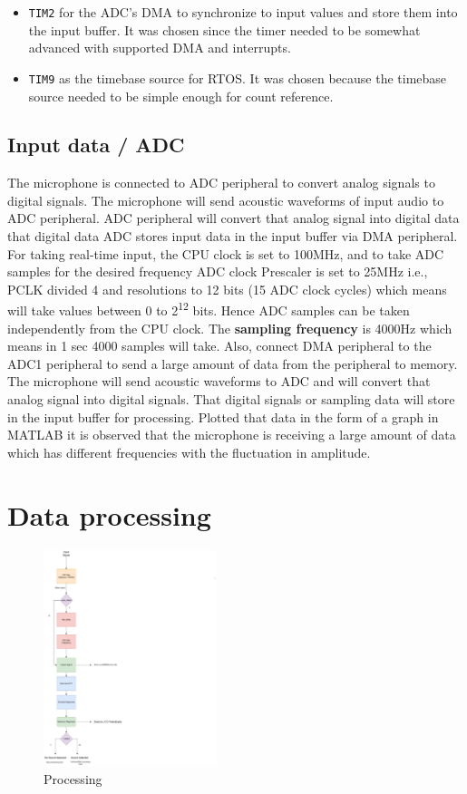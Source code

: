 \documentclass[11pt]{article}
\begin{document}
\begin{itemize}
\item \texttt{TIM2} for the ADC's DMA to synchronize to input values and store them into the input buffer. It was chosen since the timer needed to be somewhat advanced with supported DMA and interrupts.
\item \texttt{TIM9} as the timebase source for RTOS. It was chosen because the timebase source needed to be simple enough for count reference.
\end{itemize}

\subsection{Input data / ADC}
\label{sec:org05730ed}


The microphone is connected to ADC peripheral to convert analog signals to digital signals. The microphone will send acoustic waveforms of input audio to ADC peripheral. ADC peripheral will convert that analog signal into digital data that digital data ADC stores input data in the input buffer via DMA peripheral.
For taking real-time input, the CPU clock is set to 100MHz, and to take ADC samples for the desired frequency ADC clock Prescaler is set to 25MHz i.e., PCLK divided 4 and resolutions to 12 bits (15 ADC clock cycles) which means will take values between 0 to 2\textsuperscript{12} bits. Hence ADC samples can be taken independently from the CPU clock. The \textbf{sampling frequency} is 4000Hz which means in 1 sec 4000 samples will take.  Also, connect DMA peripheral to the ADC1 peripheral to send a large amount of data from the peripheral to memory.  The microphone will send acoustic waveforms to ADC and will convert that analog signal into digital signals. That digital signals or sampling data will store in the input buffer for processing. Plotted that data in the form of a graph in MATLAB it is observed that the microphone is receiving a large amount of data which has different frequencies with the fluctuation in amplitude.

\section{Data processing}
\label{sec:orgb86537f}

\begin{figure}[H]
    \centering
    \includegraphics[width=0.45\textwidth, trim={0cm 0cm 15cm 0cm}, clip]{Processing.pdf}
    \caption{Processing}
    \end{figure}
\end{document}
